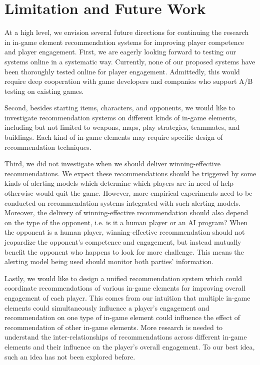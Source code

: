 \chapter{Limitation and Future Work} 

\label{chapter:future} 

At a high level, we envision several future directions for continuing the research in in-game element recommendation systems for improving player competence and player engagement. First, we are eagerly looking forward to testing our systems online in a systematic way. Currently, none of our proposed systems have been thoroughly tested online for player engagement. Admittedly, this would require deep cooperation with game developers and companies who support A/B testing on existing games. 

Second, besides starting items, characters, and opponents, we would like to investigate recommendation systems on different kinds of in-game elements, including but not limited to weapons, maps, play strategies, teammates, and buildings. Each kind of in-game elements may require specific design of recommendation techniques. 

Third, we did not investigate when we should deliver winning-effective recommendations. We expect these recommendations should be triggered by some kinds of alerting models which determine which players are in need of help otherwise would quit the game. However, more empirical experiments need to be conducted on recommendation systems integrated with such alerting models. Moreover, the delivery of winning-effective recommendation should also depend on the type of the opponent, i.e. is it a human player or an AI program? When the opponent is a human player, winning-effective recommendation should not jeopardize the opponent's competence and engagement, but instead mutually benefit the opponent who happens to look for more challenge. This means the alerting model being used should monitor both parties' information.

Lastly, we would like to design a unified recommendation system which could coordinate  recommendations of various in-game elements for improving overall engagement of each player. This comes from our intuition that multiple in-game elements could simultaneously influence a player's engagement and recommendation on one type of in-game element could influence the effect of recommendation of other in-game elements. More research is needed to understand the inter-relationships of recommendations across different in-game elements and their influence on the player's overall engagement. To our best idea, such an idea has not been explored before.


